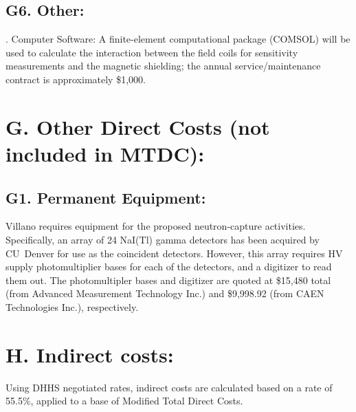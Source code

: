 \documentclass[11pt]{article}
\def\ni{\noindent}
\def\ss{\smallskip}
\begin{document}
\subsection*{G6. Other:}

\ss \ni 5. Computer Software: A finite-element computational package (COMSOL) will be used to calculate the interaction between the field coils for sensitivity measurements and the magnetic shielding; the annual service/maintenance contract is approximately \$1,000.


\section*{\bf G. Other Direct Costs (not included in MTDC):}
%
\subsection*{G1. Permanent Equipment:}
Villano requires equipment for the proposed neutron-capture activities. Specifically, an array of 24 NaI(Tl) gamma detectors has been acquired by CU~Denver for use as the coincident detectors. However, this array requires HV supply photomultiplier bases for each of the detectors, and a digitizer to read them out. The photomultipler bases and digitizer are quoted at \$15,480 total (from Advanced Measurement Technology Inc.) and \$9,998.92 (from CAEN Technologies Inc.), respectively.    


\section*{H. Indirect costs: } 

Using DHHS negotiated rates, indirect costs are calculated based on a rate of 55.5\%, applied to a base of Modified Total Direct Costs. 
\end{document}
